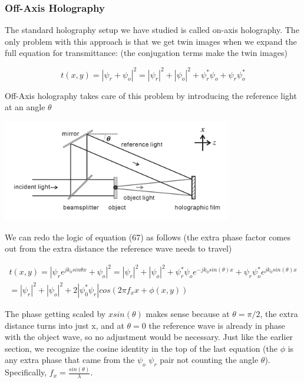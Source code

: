 \documentclass[12pt]{article}
\begin{document}
\subsubsection{Off-Axis Holography}

The standard holography setup we have studied is called on-axis holography.
The only problem with this approach is that we get twin images when we expand
the full equation for transmittance: (the conjugation terms make the twin images)

\begin{equation}
	t(x,y) = |\psi_{r} + \psi_{o}|^2 = |\psi_{r}|^2 + |\psi_{o}|^2
	 + \psi_{r}^*\psi_{o} + \psi_{r}\psi_{o}^*
\end{equation}

Off-Axis holography takes care of this problem by introducing the reference
light at an angle \(\theta\)

\begin{center}
\includegraphics[width=100mm]{tupac9.png}
\end{center}

We can redo the logic of equation (67) as follows (the extra phase factor comes
out from the extra distance the reference wave needs to travel)

\begin{equation}
	\begin{multlined}
	t(x,y) = |\psi_{r}e^{jk_{0}sin\theta x} + \psi_{o}|^2 = |\psi_{r}|^2 + |\psi_{o}|^2
         + \psi_{r}^*\psi_{o}e^{-jk_{0}sin(\theta) x} + \psi_{r}\psi_{o}^*e^{jk_{0}sin(\theta)x}
	\\=|\psi_{r}|^2 + |\psi_{o}|^2 + 2|\psi_{0}^*\psi_{r}|cos(2\pi f_{x}x + \phi (x,y))
	\end{multlined}
\end{equation}

The phase getting scaled by \(xsin(\theta)\) makes sense because at \(\theta = \pi/2\), the extra distance turns into just x, and at \(\theta = 0\)
the reference wave is already in phase with the object wave, so no adjustment would be necessary. Just like the earlier section,
we recognize the cosine identity in the top of the last equation (the \(\phi\) is any extra phase that came from the \(\psi_{o}\) \(\psi_{r}\) pair not counting
the angle \(\theta\)). Specifically, \(f_{x} = \frac{sin(\theta)}{\lambda}\).
\end{document}
